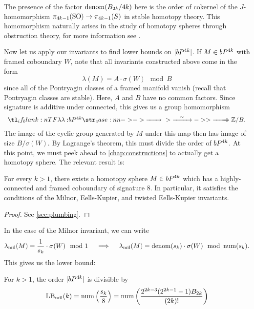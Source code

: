 \begin{remark}
	The presence of the factor $\operatorname{denom}(B_{2k}/4k)$ here is the order of cokernel of the $J$-homomorphism $\pi_{4k-1}(\mathrm{SO}) \to \pi_{4k-1}(S)$ in stable homotopy theory. This homomorphism naturally arises in the study of homotopy spheres through obstruction theory, for more information see \cite{milnorkervaire1960bernoulli}.
\end{remark}

Now let us apply our invariants to find lower bounds on $|bP^{4k}|$. If $M\in bP^{4k}$ with framed coboundary $W$, note that all invariants constructed above come in the form
\[
		\lambda(M) = A\cdot \sigma(W) \mod B
\]
since all of the Pontryagin classes of a framed manifold vanish (recall that Pontryagin classes are stable). Here, $A$ and $B$ have no common factors. Since signature is additive under connected, this gives us a group homomorphism
\[
	\lkxfunc{\lambda}{\bP^{4k}}{\Z/B.}
\]
The image of the cyclic group generated by $M$ under this map then has image of size $B/\sigma(W)$. By Lagrange's theorem, this must divide the order of $bP^{4k}$. At this point, we must peek ahead to \cref{chap:constructions} to actually get a homotopy sphere. The relevant result is:

\begin{proposition}
	For every $k>1$, there exists a homotopy sphere $M\in bP^{4k}$ which has a highly-connected and framed coboundary of signature 8. In particular, it satisfies the conditions of the Milnor, Eells-Kupier, and twisted Eells-Kupier invariants.
\end{proposition}
\begin{proof}
	See \cref{sec:plumbing}.
\end{proof}

In the case of the Milnor invariant, we can write
\[
	\lambda_{\mathrm{mil}}(M) = \frac{1}{s_k}\cdot \sigma(W)\mod 1\quad\implies\quad \lambda_{\mathrm{mil}}(M) = \operatorname{denom}(s_k)\cdot \sigma(W)\mod {\operatorname{num}}(s_k).
\]
This gives us the lower bound:

\begin{proposition}\label{prop:milnor-lower-bound}
	For $k>1$, the order $|bP^{4k}|$ is divisible by
	\[
		\mathrm{LB}_{\mathrm{mil}}(k) =\operatorname{num}\left(\frac{s_k}{8}\right) = \operatorname{num}\left(\frac{2^{2k-3}(2^{2k-1}-1)B_{2k}}{(2k)!}\right)
	\]
\end{proposition}

